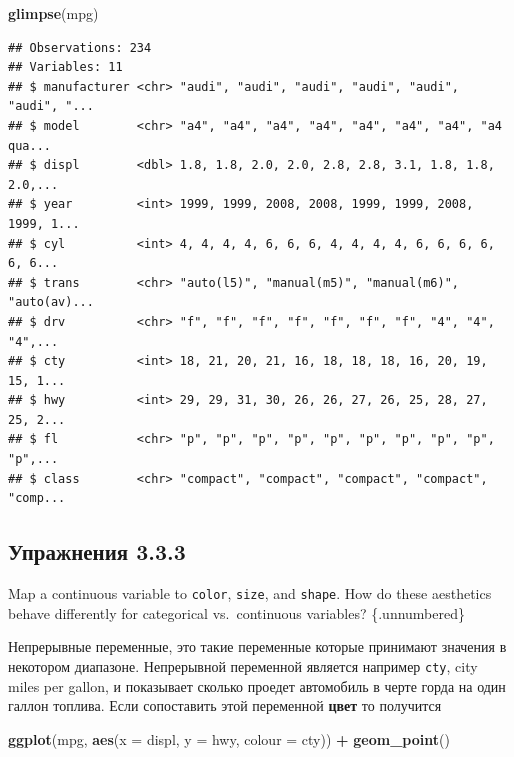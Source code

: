 \documentclass[]{book}
\newenvironment{Shaded}{\begin{snugshade}}{\end{snugshade}}
\newcommand{\KeywordTok}[1]{\textcolor[rgb]{0.13,0.29,0.53}{\textbf{#1}}}
\newcommand{\DataTypeTok}[1]{\textcolor[rgb]{0.13,0.29,0.53}{#1}}
\newcommand{\StringTok}[1]{\textcolor[rgb]{0.31,0.60,0.02}{#1}}
\newcommand{\OperatorTok}[1]{\textcolor[rgb]{0.81,0.36,0.00}{\textbf{#1}}}
\newcommand{\NormalTok}[1]{#1}
\begin{document}
\begin{Shaded}
\begin{Highlighting}[]
\KeywordTok{glimpse}\NormalTok{(mpg)}
\end{Highlighting}
\end{Shaded}

\begin{verbatim}
## Observations: 234
## Variables: 11
## $ manufacturer <chr> "audi", "audi", "audi", "audi", "audi", "audi", "...
## $ model        <chr> "a4", "a4", "a4", "a4", "a4", "a4", "a4", "a4 qua...
## $ displ        <dbl> 1.8, 1.8, 2.0, 2.0, 2.8, 2.8, 3.1, 1.8, 1.8, 2.0,...
## $ year         <int> 1999, 1999, 2008, 2008, 1999, 1999, 2008, 1999, 1...
## $ cyl          <int> 4, 4, 4, 4, 6, 6, 6, 4, 4, 4, 4, 6, 6, 6, 6, 6, 6...
## $ trans        <chr> "auto(l5)", "manual(m5)", "manual(m6)", "auto(av)...
## $ drv          <chr> "f", "f", "f", "f", "f", "f", "f", "4", "4", "4",...
## $ cty          <int> 18, 21, 20, 21, 16, 18, 18, 18, 16, 20, 19, 15, 1...
## $ hwy          <int> 29, 29, 31, 30, 26, 26, 27, 26, 25, 28, 27, 25, 2...
## $ fl           <chr> "p", "p", "p", "p", "p", "p", "p", "p", "p", "p",...
## $ class        <chr> "compact", "compact", "compact", "compact", "comp...
\end{verbatim}

\subsection*{Упражнения 3.3.3}\label{-3.3.3}

Map a continuous variable to \texttt{color}, \texttt{size}, and
\texttt{shape}. How do these aesthetics behave differently for
categorical vs.~continuous variables? \{.unnumbered\}

Непрерывные переменные, это такие переменные которые принимают значения
в некотором диапазоне. Непрерывной переменной является например
\texttt{cty}, city miles per gallon, и показывает сколько проедет
автомобиль в черте горда на один галлон топлива. Если сопоставить этой
переменной \textbf{цвет} то получится

\begin{Shaded}
\begin{Highlighting}[]
\KeywordTok{ggplot}\NormalTok{(mpg, }\KeywordTok{aes}\NormalTok{(}\DataTypeTok{x =}\NormalTok{ displ, }\DataTypeTok{y =}\NormalTok{ hwy, }\DataTypeTok{colour =}\NormalTok{ cty)) }\OperatorTok{+}
\StringTok{   }\KeywordTok{geom_point}\NormalTok{()}
\end{Highlighting}
\end{Shaded}
\end{document}
